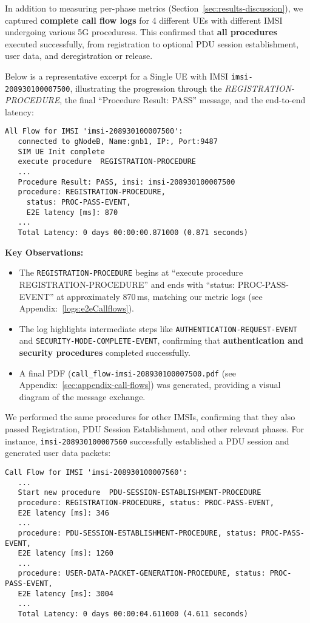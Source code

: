 In addition to measuring per-phase metrics (Section~\ref{sec:results-discussion}), we captured \textbf{complete call flow logs} for 4 different UEs with different IMSI undergoing various 5G proceduress. This confirmed that \textbf{all procedures} executed successfully, from registration to optional PDU session establishment, user data, and deregistration or release.

Below is a representative excerpt for a Single UE with IMSI \texttt{imsi-208930100007500}, illustrating the progression through the \textit{REGISTRATION-PROCEDURE}, the final ``Procedure Result: PASS'' message, and the end-to-end latency:

\begin{verbatim}
All Flow for IMSI 'imsi-208930100007500':
   connected to gNodeB, Name:gnb1, IP:, Port:9487
   SIM UE Init complete
   execute procedure  REGISTRATION-PROCEDURE
   ...
   Procedure Result: PASS, imsi: imsi-208930100007500
   procedure: REGISTRATION-PROCEDURE,
     status: PROC-PASS-EVENT,
     E2E latency [ms]: 870
   ...
   Total Latency: 0 days 00:00:00.871000 (0.871 seconds)
\end{verbatim}
\noindent
\textbf{Key Observations:}
\begin{itemize}
  \item The \texttt{REGISTRATION-PROCEDURE} begins at ``execute procedure REGISTRATION-PROCEDURE'' and ends with ``status: PROC-PASS-EVENT'' at approximately 870\,ms, matching our metric logs (see Appendix:~\ref{logs:e2eCallflows}).
  \item The log highlights intermediate steps like \texttt{AUTHENTICATION-REQUEST-EVENT} and \texttt{SECURITY-MODE-COMPLETE-EVENT}, confirming that \textbf{authentication and security procedures} completed successfully.
  \item A final PDF (\texttt{call\_flow-imsi-208930100007500.pdf} (see Appendix:~\ref{sec:appendix-call-flows}) was generated, providing a visual diagram of the message exchange.
\end{itemize}

We performed the same procedures for other IMSIs, confirming that they also passed Registration, PDU Session Establishment, and other relevant phases. For instance, \texttt{imsi-208930100007560} successfully established a PDU session and generated user data packets:

\begin{lstlisting}[breaklines=true, basicstyle=\small\ttfamily]
Call Flow for IMSI 'imsi-208930100007560':
   ...
   Start new procedure  PDU-SESSION-ESTABLISHMENT-PROCEDURE
   procedure: REGISTRATION-PROCEDURE, status: PROC-PASS-EVENT, 
   E2E latency [ms]: 346
   ...
   procedure: PDU-SESSION-ESTABLISHMENT-PROCEDURE, status: PROC-PASS-EVENT, 
   E2E latency [ms]: 1260
   ...
   procedure: USER-DATA-PACKET-GENERATION-PROCEDURE, status: PROC-PASS-EVENT, 
   E2E latency [ms]: 3004
   ...
   Total Latency: 0 days 00:00:04.611000 (4.611 seconds)
\end{lstlisting}



